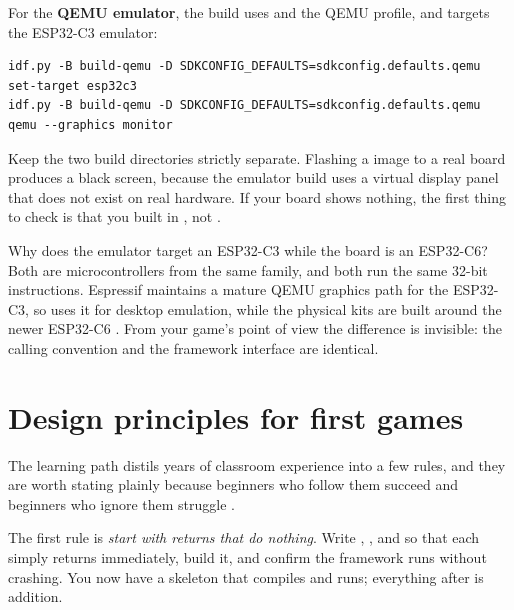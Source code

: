 For the \textbf{QEMU emulator}, the build uses  and the QEMU
profile, and targets the ESP32\nobreakdash-C3 emulator:

\begin{lstlisting}[style=bash,caption={Building and running for the desktop emulator.}]
idf.py -B build-qemu -D SDKCONFIG_DEFAULTS=sdkconfig.defaults.qemu set-target esp32c3
idf.py -B build-qemu -D SDKCONFIG_DEFAULTS=sdkconfig.defaults.qemu qemu --graphics monitor
\end{lstlisting}

\begin{prgwarn}
Keep the two build directories strictly separate. Flashing a 
image to a real board produces a black screen, because the emulator build uses a
virtual display panel that does not exist on real hardware. If your board shows
nothing, the first thing to check is that you built in , not
 \citep{prg32qemu}.
\end{prgwarn}

\begin{prgaside}
Why does the emulator target an ESP32\nobreakdash-C3 while the board is an ESP32\nobreakdash-C6? Both
are \riscv microcontrollers from the same family, and both run the same 32-bit
\riscv instructions. Espressif maintains a mature QEMU graphics path for the
ESP32\nobreakdash-C3, so \prg uses it for desktop emulation, while the physical kits are
built around the newer ESP32\nobreakdash-C6 \citep{prg32qemu}. From your game's point of
view the difference is invisible: the calling convention and the framework
interface are identical.
\end{prgaside}

\section{Design principles for first games}

The \prg learning path distils years of classroom experience into a few rules,
and they are worth stating plainly because beginners who follow them succeed and
beginners who ignore them struggle \citep{prg32repo,prg32tutorial}.

The first rule is \emph{start with returns that do nothing}. Write ,
, and  so that each simply returns immediately, build it,
and confirm the framework runs without crashing. You now have a skeleton that
compiles and runs; everything after is addition.

